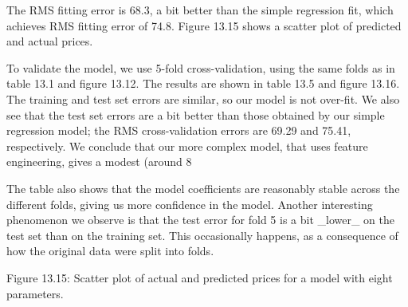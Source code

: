 The RMS fitting error is 68.3, a bit better than the simple regression fit, which achieves RMS fitting error of 74.8. Figure 13.15 shows a scatter plot of predicted and actual prices.

To validate the model, we use 5-fold cross-validation, using the same folds as in table 13.1 and figure 13.12. The results are shown in table 13.5 and figure 13.16. The training and test set errors are similar, so our model is not over-fit. We also see that the test set errors are a bit better than those obtained by our simple regression model; the RMS cross-validation errors are 69.29 and 75.41, respectively. We conclude that our more complex model, that uses feature engineering, gives a modest (around 8%

The table also shows that the model coefficients are reasonably stable across the different folds, giving us more confidence in the model. Another interesting phenomenon we observe is that the test error for fold 5 is a bit _lower_ on the test set than on the training set. This occasionally happens, as a consequence of how the original data were split into folds.

Figure 13.15: Scatter plot of actual and predicted prices for a model with eight parameters.

 